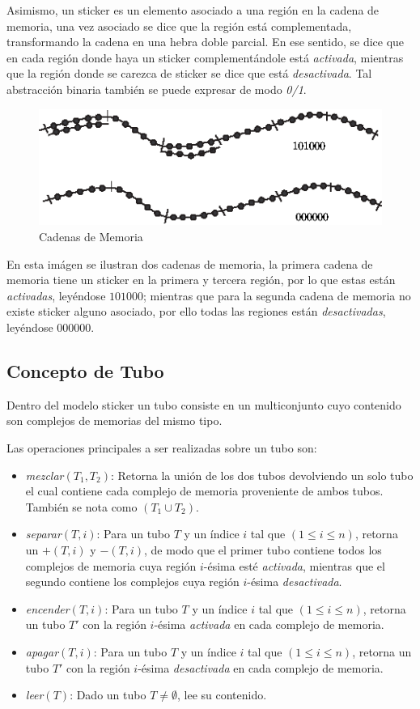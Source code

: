\documentclass[12pt, letterpaper, twoside]{article}
\begin{document}
    Asimismo, un sticker es un elemento asociado a una región en la cadena de memoria, una vez asociado se dice que la región está complementada, transformando la cadena en una hebra doble parcial. En ese sentido, se dice que en cada región donde haya un sticker complementándole está \emph{activada}, mientras que la región donde se carezca de sticker se dice que está \emph{desactivada}. Tal abstracción binaria también se puede expresar de modo \emph{0/1}.

    \newpage
    \begin{figure}[h!]
        \centering
        \includegraphics[width=\linewidth]{sticker.png}
        \caption{Cadenas de Memoria}
    \end{figure}

    En esta imágen se ilustran dos cadenas de memoria, la primera cadena de memoria tiene un sticker en la primera y tercera región, por lo que estas están \emph{activadas}, leyéndose $101000$; mientras que para la segunda cadena de memoria no existe sticker alguno asociado, por ello todas las regiones están \emph{desactivadas}, leyéndose $000000$.

    \subsection{Concepto de Tubo}
    Dentro del modelo sticker un tubo consiste en un multiconjunto cuyo contenido son complejos de memorias del mismo tipo.

    Las operaciones principales a ser realizadas sobre un tubo son:
    \begin{itemize}
        \item \emph{mezclar}$(T_1,T_2)$: Retorna la unión de los dos tubos devolviendo un solo tubo el cual contiene cada complejo de memoria proveniente de ambos tubos. También se nota como $(T_1\cup T_2)$.
        \item \emph{separar}$(T, i)$: Para un tubo $T$ y un índice $i$ tal que $(1 \leq i \leq n)$, retorna un $+(T, i)$ y $-(T, i)$, de modo que el primer tubo contiene todos los complejos de memoria cuya región $i$-ésima esté \emph{activada}, mientras que el segundo contiene los complejos cuya región $i$-ésima \emph{desactivada}.
        \item \emph{encender}$(T, i)$: Para un tubo $T$ y un índice $i$ tal que $(1 \leq i \leq n)$, retorna un tubo $T'$ con la región $i$-ésima \emph{activada} en cada complejo de memoria.
        \item \emph{apagar}$(T, i)$: Para un tubo $T$ y un índice $i$ tal que $(1 \leq i \leq n)$, retorna un tubo $T'$ con la región $i$-ésima \emph{desactivada} en cada complejo de memoria.
        \item \emph{leer}$(T)$: Dado un tubo $T\neq\emptyset$, lee su contenido.
    \end{itemize}
\end{document}

